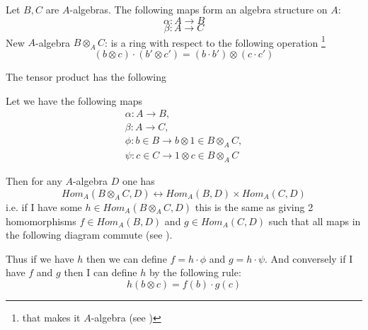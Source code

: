 Let $B, C$ are $A$-algebras. The following maps form an algebra
structure on $A$:
\[
\alpha: A \to B
\]
\[
\beta: A \to C
\]
New $A$-algebra $B \otimes_A C$: is a ring with respect to the
following operation
\footnote{
  that makes it $A$-algebra (see )
}
\[
\left(b \otimes c \right) \cdot \left(b' \otimes c'\right) =
\left(b \cdot b'\right) \otimes \left(c \cdot c'\right)
\]

The tensor product has the following 
\begin{definition}
  Let we have the following maps
  \begin{eqnarray}
    \alpha: A \to B,
    \nonumber \\
    \beta: A \to C,
    \nonumber \\
    \phi: b \in B \to b \otimes 1 \in B \otimes_A C,
    \nonumber \\
    \psi: c \in C \to 1 \otimes c \in B \otimes_A C
    \nonumber
  \end{eqnarray}

  Then for any $A$-algebra $D$ one has
  \[
  Hom_A\left(B \otimes_A C, D\right)
  \leftrightarrow
  Hom_A\left(B, D\right) \times
  Hom_A\left(C, D\right)
  \]
  i.e. if I have some 
  $h \in Hom_A\left(B \otimes_A C, D\right)$ this is the same as
  giving 2 homomorphisms
  $f \in Hom_A\left(B, D\right)$ and
  $g \in Hom_A\left(C, D\right)$ such that all maps in the following
  diagram commute (see ).
  

  Thus if we have $h$ then we can define
  $f = h \cdot \phi$ and $g = h \cdot \psi$. And conversely if I have
  $f$ and $g$ then I can define $h$ by the following rule:
  \[
  h\left(b \otimes c\right) = f(b) \cdot g(c)
  \]
\end{definition}

